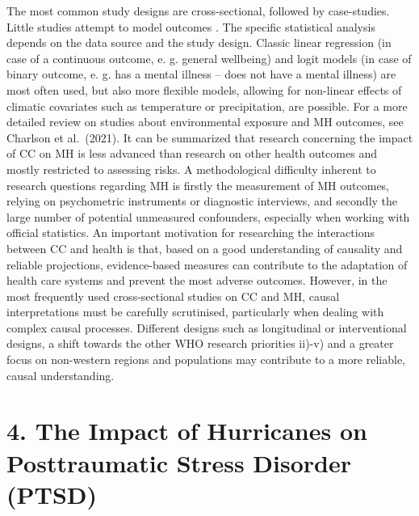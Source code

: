 \documentclass[
]{krantz}
\begin{document}
The most common study designs are cross-sectional, followed by case-studies. Little studies attempt to model outcomes \citep{charlsonClimateChangeMental2021}.
The specific statistical analysis depends on the data source and the study design. Classic linear regression (in case of a continuous outcome, e. g. general wellbeing) and logit models (in case of binary outcome, e. g. has a mental illness -- does not have a mental illness) are most often used, but also more flexible models, allowing for non-linear effects of climatic covariates such as temperature or precipitation, are possible.
For a more detailed review on studies about environmental exposure and MH outcomes, see Charlson et al.~(2021).
It can be summarized that research concerning the impact of CC on MH is less advanced than research on other health outcomes and mostly restricted to assessing risks. A methodological difficulty inherent to research questions regarding MH is firstly the measurement of MH outcomes, relying on psychometric instruments or diagnostic interviews, and secondly the large number of potential unmeasured confounders, especially when working with official statistics.
An important motivation for researching the interactions between CC and health is that, based on a good understanding of causality and reliable projections, evidence-based measures can contribute to the adaptation of health care systems and prevent the most adverse outcomes. However, in the most frequently used cross-sectional studies on CC and MH, causal interpretations must be carefully scrutinised, particularly when dealing with complex causal processes. Different designs such as longitudinal or interventional designs, a shift towards the other WHO research priorities ii)-v) and a greater focus on non-western regions and populations may contribute to a more reliable, causal understanding.

\section{4. The Impact of Hurricanes on Posttraumatic Stress Disorder (PTSD)}\label{the-impact-of-hurricanes-on-posttraumatic-stress-disorder-ptsd}
\end{document}
